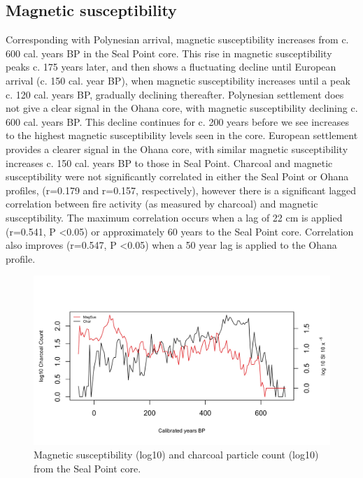 \subsection{Magnetic susceptibility}\label{magnetic-susceptibility-1}

Corresponding with Polynesian arrival, magnetic susceptibility increases
from c. 600 cal. years BP in the Seal Point core. This rise in magnetic
susceptibility peaks c. 175 years later, and then shows a fluctuating
decline until European arrival (c. 150 cal. year BP), when magnetic
susceptibility increases until a peak c. 120 cal. years BP, gradually
declining thereafter. Polynesian settlement does not give a clear signal
in the Ohana core, with magnetic susceptibility declining c. 600 cal.
years BP. This decline continues for c. 200 years before we see
increases to the highest magnetic susceptibility levels seen in the
core. European settlement provides a clearer signal in the Ohana core,
with similar magnetic susceptibility increases c. 150 cal. years BP to
those in Seal Point. Charcoal and magnetic susceptibility were not
significantly correlated in either the Seal Point or Ohana profiles,
(r=0.179 and r=0.157, respectively), however there is a significant
lagged correlation between fire activity (as measured by charcoal) and
magnetic susceptibility. The maximum correlation occurs when a lag of 22
cm is applied (r=0.541, P \textless{}0.05) or approximately 60 years to
the Seal Point core. Correlation also improves (r=0.547, P
\textless{}0.05) when a 50 year lag is applied to the Ohana profile.

\begin{figure}
\centering
\includegraphics{mag-sus-seal.jpeg}
\caption{Magnetic susceptibility (log10) and charcoal particle count
(log10) from the Seal Point core.{}}
\end{figure}

